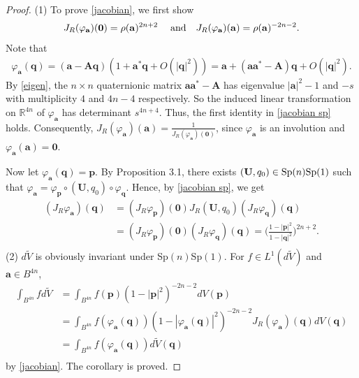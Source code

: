 \documentclass[a4paper,11pt]{amsart}
\numberwithin{equation}{section}
\begin{document}
\begin{proof}
(1) To prove \eqref{jacobian}, we first show
\begin{equation}\begin{aligned}\label{jacobian sp}
J_R(\varphi_{\mathbf{a}})(\mathbf{0})=\rho(\mathbf{a})^{2n+2}\quad{\rm \;and}\quad J_R(\varphi_{\mathbf{a}})(\mathbf{a})=\rho(\mathbf{a})^{-2n-2}.
\end{aligned}\end{equation}
Note that
\begin{equation*}\begin{aligned}
\varphi_{\mathbf{a}}(\mathbf{q})=(\mathbf{a}-\mathbf{A}\mathbf{q})(1+\mathbf{a}^*\mathbf{q}+O(|\mathbf{q}|^2))=\mathbf{a}+(\mathbf{a}\mathbf{a}^*-\mathbf{A})\mathbf{q}+O(|\mathbf{q}|^2).
\end{aligned}\end{equation*}
By \eqref{eigen}, the $n\times n$ quaternionic matrix $\mathbf{a}\mathbf{a}^*-\mathbf{A}$ has eigenvalue $|\mathbf{a}|^2-1$ and $-s$ with multiplicity $4$ and $4n-4$ respectively.
So the induced linear transformation on $\mathbb{R}^{4n}$ of $\varphi_{\mathbf{a}}$ has determinant $s^{4n+4}$. Thus, the first identity in \eqref{jacobian sp} holds. Consequently, $J_R(\varphi_{\mathbf{a}})(\mathbf{a})=\frac{1}{J_R(\varphi_{\mathbf{a}})(\mathbf{0})}$, since $\varphi_{\mathbf{a}}$ is an involution and $\varphi_{\mathbf{a}}(\mathbf{a})=\mathbf{0}$.

  Now let $\varphi_{\mathbf{a}}(\mathbf{q})=\mathbf{p}$. By Proposition 3.1, there exists $(\mathbf{U},q_0)\in {\rm Sp}(n){\rm Sp}(1)$ such that $\varphi_{\mathbf{a}}=\varphi_{\mathbf{p}}\circ (\mathbf{U},q_0)\circ\varphi_{\mathbf{q}}$. Hence, by \eqref{jacobian sp}, we get
\begin{equation*}\begin{aligned}
(J_R\varphi_{\mathbf{a}})(\mathbf{q})&=(J_R\varphi_{\mathbf{p}})(\mathbf{0})J_R( \mathbf{U},q_0)(J_R\varphi_{\mathbf{q}})(\mathbf{q})\\
&=(J_R\varphi_{\mathbf{p}})(\mathbf{0})(J_R\varphi_{\mathbf{q}})(\mathbf{q})=\bigg(\frac{1-|\mathbf{p}|^2}{1-|\mathbf{q}|^2}\bigg)^{2n+2}.\\
\end{aligned}\end{equation*}
(2) $d\widetilde{V}$ is obviously invariant under Sp$(n)$Sp$(1)$. For $f\in L^1(d\widetilde{V})$ and $\mathbf{a}\in B^{4n}$,
\begin{equation*}\begin{aligned}
\int_{B^{4n}} fd\widetilde{V}&=\int_{B^{4n}} f(\mathbf{p})\left(1-|\mathbf{p}|^2\right)^{-2n-2}dV(\mathbf{p})\\
&=\int_{B^{4n}} f(\varphi_{\mathbf{a}}(\mathbf{q}))\left(1-|\varphi_{\mathbf{a}}(\mathbf{q})|^2\right)^{-2n-2}J_R(\varphi_{\mathbf{a}})(\mathbf{q})dV(\mathbf{q})\\
&=\int_{B^{4n}} f(\varphi_{\mathbf{a}}(\mathbf{q}))d\widetilde{V}(\mathbf{q})\\
\end{aligned}\end{equation*}
by \eqref{jacobian}. The corollary is proved.
\end{proof}
\end{document}
